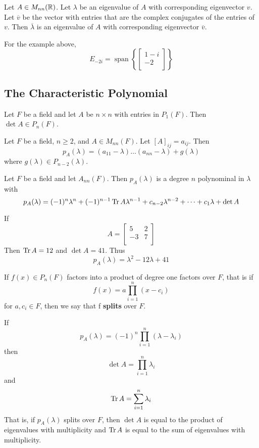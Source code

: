 \documentclass{article}
\DeclareMathOperator{\spn}{span}
\begin{document}
\begin{theorem}
  Let $A \in M_{nn}(\mathbb{R})$. Let $\lambda$ be an eigenvalue of $A$ with corresponding eigenvector $v$. Let $\overline{v}$ be the vector with entries that are the complex conjugates of the entries of $v$. Then $\overline{\lambda}$ is an eigenvalue of $A$ with corresponding eigenvector $\overline{v}$.
\end{theorem}
\begin{example}
  For the example above, \[
    E_{-2i} = \spn \left\{
      \begin{bmatrix}
        1 - i\\
        -2\\
    \end{bmatrix}\right\}
  \]
\end{example}
\subsection{The Characteristic Polynomial}
\begin{theorem}
  Let $F$ be a field and let $A$ be $n \times n$ with entries in $P_1(F)$. Then $\det A \in P_n(F)$.
\end{theorem}
\begin{theorem}
  Let $F$ be a field, $n \geq 2$, and $A \in M_{nn}(F)$. Let $[A]_{ij} = a_{ij}$. Then \[
    p_A(\lambda) = (a_{11} - \lambda)\dots(a_{nn} - \lambda) + g(\lambda)
  \] where $g(\lambda) \in P_{n-2}(\lambda)$.
\end{theorem}
\begin{theorem}
  Let $F$ be a field and let $A_{nn}(F)$. Then $p_A(\lambda)$ is a degree $n$ polynominal in $\lambda$ with \[
    p_A(\lambda) = (-1)^n\lambda^n + (-1)^{n-1}\Tr A\lambda^{n-1} + c_{n-2}\lambda^{n-2} + \dots + c_1\lambda + \det A
  \]
\end{theorem}
\begin{example}
  If \[
    A =
    \begin{bmatrix}
      5 & 2\\
      -3 & 7\\
    \end{bmatrix}
  \]
  Then $\Tr A =  12$ and $\det A = 41$. Thus \[
    p_A(\lambda) = \lambda^2 - 12\lambda + 41
  \]
\end{example}
\begin{definition}
  If $f(x) \in P_n(F)$ factors into a product of degree one factors over $F$, that is if \[
    f(x) = a\prod_{i=1}^n (x-c_i)
  \] for $a, c_i \in F$, then we say that f \textbf{splits} over $F$.
\end{definition}
\begin{theorem}
  If \[
    p_A(\lambda) = (-1)^n \prod_{i=1}^n (\lambda - \lambda_i)
  \] then \[
    \det A = \prod_{i=1}^n \lambda_i
  \] and \[
    \Tr A = \sum_{i=1}^n \lambda_i
  \]
  That is, if $p_A(\lambda)$ splits over $F$, then $\det A$ is equal to the product of eigenvalues with multiplicity and $\Tr A$ is equal to the sum of eigenvalues with multiplicity.
\end{theorem}
\end{document}
